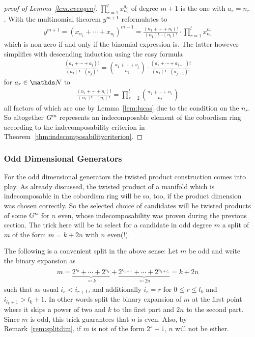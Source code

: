 \begin{proof}[proof of
  Lemma~\ref{lem:evengen}]
  $\prod_{r=1}^{l}x_{n_r}^{a_r}$ of degree $m+1$ is the one with
  $a_r=n_r$.
  With the multinomial theorem $y^{m+1}$ reformulates to
  \begin{gather*}
    y^{m+1}
    = (x_{n_1}+\dotsb+x_{n_l})^{m+1}
    = \frac{(n_1 + \dotsb + n_l)!} {(n_1)! \dotsm (n_l)!}
    \cdot \prod_{r=1}^{l}x_{n_r}^{n_r}
  \end{gather*}
  which is non-zero if and only if the binomial expression is.
  The latter however simplifies with descending induction using the
  easy formula
  \begin{gather*}
    \frac{(a_1+\dotsb+a_j)!}{(a_1)!\dotsm(a_j)!}
    = \binom{a_1+\dotsb+a_j}{a_j}
    \cdot \frac{(a_1+\dotsb+a_{j-1})!}{(a_1)!\dotsm(a_{j-1})!}
  \end{gather*}
  for $a_r\in\Nat$ to
  \begin{gather*}
    \frac{(n_1+\dotsb+n_l)!}{(n_1)! \dotsm (n_l)!}
    = \prod_{r=2}^{l}\binom{n_1+\dotsb+n_r}{n_r}
  \end{gather*}
  all factors of which are one by Lemma~\ref{lem:lucas} due to the
  condition on the $n_r$.
  So altogether $G^{m}$ represents an indecomposable element of
  the cobordism ring according to the indecomposability criterion
  in Theorem~\ref{thm:indecomposabilitycriterion}.
  \qedhere
\end{proof}

\subsubsection{Odd Dimensional Generators}
For the odd dimensional generators the twisted product construction
comes into play.
As already discussed, the twisted product of a manifold which is
indecomposable in the cobordism ring will be so, too, if the product
dimension was chosen correctly. So the selected choice of candidates
will be twisted products of some $G^{n}$ for $n$ even, whose
indecomposability was proven during the previous section.
The trick here will be to select for a candidate in odd degree $m$ a
split of $m$ of the form $m=k+2n$ with $n$ even(!).
\begin{Rem}\label{rem:splitodddimension}
  The following is a convenient split in the above sense:
  Let $m$ be odd and write the binary expansion as 
  \begin{gather*}
    m
    = \underbrace{2^{i_0} + \dotsb + 2^{i_{l_k}}}_{\eqqcolon k}
    + \underbrace{2^{i_{l_k+1}}
      + \dotsb + 2^{i_{l_k+l_n}}}_{\eqqcolon 2n}
    = k+2n
  \end{gather*}
  such that as usual $i_r<i_{r+1}$, and additionally $i_r=r$ for
  $0\leq r\leq l_k$ and $i_{l_k+1} > l_k+1$.
  In other words split the binary expansion of $m$ at the first point
  where it skips a power of two and $k$ to the first part and $2n$ to
  the second part. Since $m$ is odd, this trick guarantees that $n$ is
  even. Also, by Remark~\ref{rem:splitdim},
  if $m$ is not of the form $2^s-1$, $n$ will not be either.
\end{Rem}


